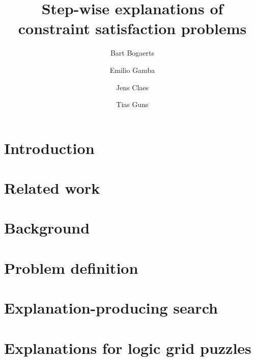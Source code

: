 \documentclass{ecai}
\newcommand\todo[1]{{\color{pink}\textsc{ToDo}: #1}}
\renewcommand\todo[1]{}
\begin{document}
\title{Step-wise explanations of constraint satisfaction problems}

\author{Bart Bogaerts \and Emilio Gamba\footnotemark[1] \and Jens Claes \and Tias Guns\footnotemark[1] }

\maketitle

\todo{This research received funding from the Flemish Government under the ``Onderzoeksprogramma Artificiële Intelligentie (AI) Vlaanderen'' programme.
}

\begin{abstract}

\end{abstract}

\todo{Check e.g. vs i.e., }
\todo{Replace ``maximally consistent interpretation'' by ``maximal consequence''}


\section{Introduction}


\section{Related work}


\section{Background}


\section{Problem definition}



\section{Explanation-producing search}\label{sec:expl-gen-prod}



\section{Explanations for logic grid puzzles}\label{sec:zebra}

\end{document}
